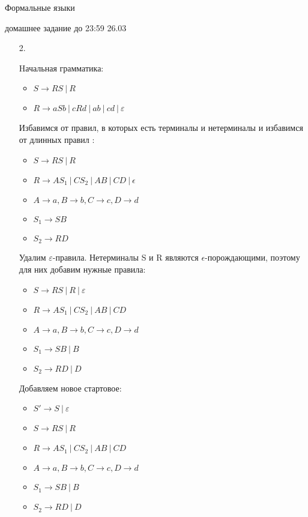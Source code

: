 \documentclass[12pt]{article}
\begin{document}
\begin{center} {\LARGE Формальные языки} \end{center}

\begin{center} \Large домашнее задание до 23:59 26.03 \end{center}
\bigskip

\begin{enumerate}
  \item[2.]
  
	 Hачальная грамматика:
		\begin{itemize}
			\item $S \to R S \ | \ R$
			\item $R \to a S b \ | \ c R d \ | \ a b \ | \ c d \ | \ \varepsilon$
		\end{itemize}
	 
	 Избавимся от правил, в которых есть терминалы и нетерминалы и избавимся от 
	 длинных правил :
 		\begin{itemize}
 			\item $S \to R S \ | \ R$
 			\item $R \to A S_1 \ | \ C S_2 \ | \ A B \ | \ C D \ | \ \epsilon$
			\item $A \to a, B \to b, C \to c, D \to d$
  			\item $S_1 \to S B$
			\item $S_2 \to R D$
 		\end{itemize}
		
 	Удалим $\varepsilon$-правила. Нетерминалы S и R являются $\epsilon$-порождающими, поэтому для них добавим нужные правила:
		\begin{itemize}
			\item $S \to R S \ | \ R \ | \ \varepsilon$
			\item $R \to A S_1 \ | \ C S_2 \ | \ A B \ | \ C D$
			\item $A \to a, B \to b, C \to c, D \to d$
			\item $S_1 \to S B \ | \ B$
			\item $S_2 \to R D \ | \ D$
		\end{itemize}
		
	Добавляем новое стартовое:
		\begin{itemize}
			\item $S' \to S \ | \ \varepsilon$
			\item $S \to R S \ | \ R$
			\item $R \to A S_1 \ | \ C S_2 \ | \ A B \ | \ C D$
			\item $A \to a, B \to b, C \to c, D \to d$
			\item $S_1 \to S B \ | \ B$
			\item $S_2 \to R D \ | \ D$
		\end{itemize}
		

\end{enumerate}
\end{document}
